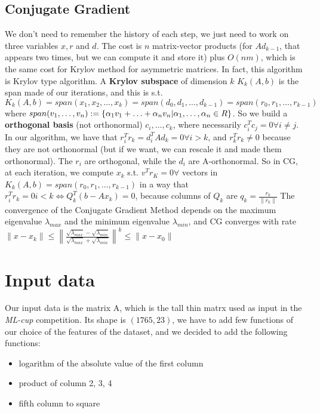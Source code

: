 \documentclass{article}
\begin{document}
\subsection{Conjugate Gradient}
We don't need to remember the history of each step, we just need to work on three variables $x, r$ and $d$. The cost is $n$ matrix-vector products (for $Ad_{k-1}$, that appears two times, but we can compute it and store it) plus $O(nm)$, which is the same cost for Krylov method for asymmetric matrices. In fact, this algorithm is Krylov type algorithm.
A \textbf{Krylov subspace} of dimension $k$ $K_{k}(A, b)$ is the span made of our iterations, and this is s.t. $K_{k}(A, b) = span(x_{1}, x_{2}, \hdots, x_{k}) = span(d_{0}, d_{1}, \hdots, d_{k-1}) = span(r_{0}, r_{1}, \hdots, r_{k-1})$ where $span(v_{1}, \hdots, v_{n}) := \{\alpha_{1}v_{1} + \hdots + \alpha_{n}v_{n}\\| \alpha_{1}, \hdots, \alpha_{n} \in R\}$.
So we build a \textbf{orthogonal basis} (not orthonormal) $c_{i}, \hdots, c_{k}$, where necessarily $c_{i}^{T}c_{j} = 0  \forall i \neq j$. In our algorithm, we have that $r_{i}^{T}r_{k} = d_{i}^{T}Ad_{k} = 0 \forall i > k$, and $r_{k}^{T}r_{k} \neq 0$ because they are not orthonormal (but if we want, we can rescale it and made them orthonormal). The $r_{i}$ are orthogonal, while the $d_{i}$ are A-orthonormal.
So in CG, at each iteration, we compute $x_{k}$ s.t. $v^{T}r_{K} = 0 \forall$ vectors in $K_{k}(A, b) = span(r_{0}, r_{1}, \hdots, r_{k-1})$ in a way that $r_{i}^{T}r_{k} = 0 i < k \iff Q_{k}^{T}(b - Ax_{k}) = 0$, because columns of $Q_{k}$ are $q_{k} = \frac{r_{k}}{\|r_{k}\|}$
The convergence of the Conjugate Gradient Method depends on the maximum eigenvalue $\lambda_{max}$ and the minimum eigenvalue $\lambda_{min}$, and CG converges with rate 
\\$\|x-x_{k}\| \leq \left\lVert\frac{\sqrt{\lambda_{max}}-\sqrt{\lambda_{min}}}{\sqrt{\lambda_{max}}+\sqrt{\lambda_{min}}}\right\rVert^{k} \leq \|x - x_{0}\|$
\section{Input data}
Our input data is the matrix A, which is the tall thin matrx used as input in the \textit{ML-cup} competition. Its shape is $(1765, 23)$, we have to add few functions of our choice of the features of the dataset, and we decided to add the following functions:
\begin{itemize}
	\item logarithm of the absolute value of the first column
	\item product of column 2, 3, 4
	\item fifth column to square
\end{itemize}
\end{document}

